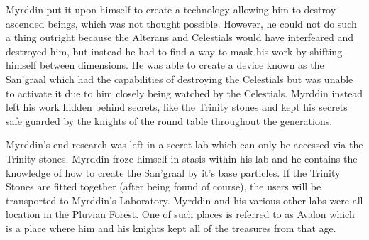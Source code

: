 Myrddin put it upon himself to create a technology allowing him to destroy ascended beings, which was not thought possible. However, he could not do such a thing outright because the Alterans and Celestials would have interfeared and destroyed him, but instead he had to find a way to mask his work by shifting himself between dimensions. He was able to create a device known as the San'graal which had the capabilities of destroying the Celestials but was unable to activate it due to him closely being watched by the Celestials. Myrddin instead left his work hidden behind secrets, like the Trinity stones and kept his secrets safe guarded by the knights of the round table throughout the generations.

Myrddin's end research was left in a secret lab which can only be accessed via the Trinity stones. Myrddin froze himself in stasis within his lab and he contains the knowledge of how to create the San'graal by it's base particles. If the Trinity Stones are fitted together (after being found of course), the users will be transported to Myrddin's Laboratory. Myrddin and his various other labs were all location in the Pluvian Forest. One of such places is referred to as Avalon which is a place where him and his knights kept all of the treasures from that age.




 


